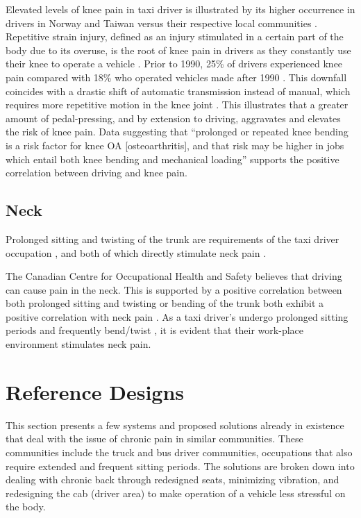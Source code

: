 \documentclass[11pt]{article}
\begin{document}
Elevated levels of knee pain in taxi driver is illustrated by its higher occurrence in drivers 
in Norway and Taiwan versus their respective local communities \cite{KneePain}. Repetitive strain 
injury, defined as an injury stimulated in a certain part of the body due to its overuse, is the 
root of knee pain in drivers \cite{RSI} as they constantly use their knee to operate a vehicle 
\cite{KneePain}. Prior to 1990, 25\% of drivers experienced knee pain compared with 18\% who 
operated vehicles made after 1990 \cite{KneePain}. This downfall coincides with a drastic shift of 
automatic transmission instead of manual, which requires more repetitive motion in the knee joint 
\cite{KneePain}. This illustrates that a greater amount of pedal-pressing, and by extension to 
driving, aggravates and elevates the risk of knee pain. Data suggesting that “prolonged or repeated 
knee bending is a risk factor for knee OA [osteoarthritis], and that risk may be higher in jobs which 
entail both knee bending and mechanical loading” \cite{Osteoarthritis} supports the positive correlation 
between driving and knee pain.



\subsection{Neck}
Prolonged sitting and twisting of the trunk are requirements of the taxi driver occupation \cite{neck}, 
and both of which directly stimulate neck pain \cite{neck}. 

The Canadian Centre for Occupational Health and Safety believes that driving can cause pain in the 
neck\cite{proof}. This is supported by a positive correlation between both prolonged sitting and 
twisting or bending of the trunk both exhibit a positive correlation with neck pain \cite{neck}. 
As a taxi driver’s undergo prolonged sitting periods and frequently bend/twist \cite{Okunribido2008, POSTUALTED},
it is evident that their work-place environment stimulates neck pain. 

\section{Reference Designs}
\label{sec:designs}

This section presents a few systems and proposed solutions already in existence that deal with the issue of
chronic pain in similar communities. These communities include the truck and bus driver communities, occupations 
that also require extended and frequent sitting periods. The solutions are broken down into dealing with chronic back 
through redesigned seats, minimizing vibration, and redesigning the cab (driver area) to make operation of a vehicle
less stressful on the body.
\end{document}
